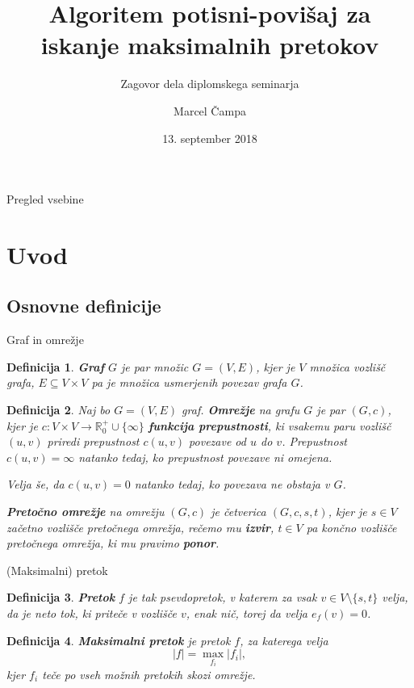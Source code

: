 \documentclass{beamer}
\title[Algoritem potisni-povišaj]{Algoritem potisni-povišaj za iskanje maksimalnih pretokov}
\subtitle{Zagovor dela diplomskega seminarja}
\author{Marcel Čampa}
\date{13. september 2018}
\institute[FMF UL]{Fakulteta za matematiko Univerze v Ljubljani}
\newtheorem{definicija}{Definicija}
\begin{document}
\begin{frame}
\maketitle
\end{frame}

\begin{frame}{Pregled vsebine}
\tableofcontents
\end{frame}


\section{Uvod}

\subsection{Osnovne definicije}
\begin{frame}{Graf in omrežje}
    \begin{definicija}
    \textbf{Graf} $G$ je par množic $G = (V,E)$, kjer je $V$ množica vozlišč grafa, $E \subseteq V \times V$ pa je množica usmerjenih povezav grafa $G$.
    \end{definicija}

    \begin{definicija}
    Naj bo $G = (V, E)$ graf. \textbf{Omrežje} na grafu $G$ je par $(G, c)$, kjer je $c \colon V \times V \rightarrow \mathbb{R}^+_0 \cup \{\infty\}$ \textbf{funkcija prepustnosti}, ki vsakemu paru vozlišč $(u,v)$ priredi prepustnost $c(u,v)$ povezave od $u$ do $v$. Prepustnost $c(u,v) = \infty$ natanko tedaj, ko prepustnost povezave ni omejena.

    Velja še, da $c(u,v)=0$ natanko tedaj, ko povezava ne obstaja v $G$.

    \textbf{Pretočno omrežje} na omrežju $(G,c)$ je četverica $(G,c,s,t)$, kjer je $s\in V$ začetno vozlišče pretočnega omrežja, rečemo mu \textbf{izvir}, $t\in V$ pa končno vozlišče pretočnega omrežja, ki mu pravimo \textbf{ponor}.
    \end{definicija}
\end{frame}

\begin{frame}{(Maksimalni) pretok}
    \begin{definicija}
    \textbf{Pretok} $f$ je tak psevdopretok, v katerem za vsak $v \in V \setminus\{s,t\}$ velja, da je neto tok, ki priteče v vozlišče $v$, enak nič, torej da velja $e_f(v) = 0$.
    \end{definicija}

    \begin{definicija}
    \textbf{Maksimalni pretok} je pretok $f$, za katerega velja \[|f| = \max_{f_i} |f_i|,\] kjer $f_i$ teče po vseh možnih pretokih skozi omrežje.
    \end{definicija}

\end{frame}
\end{document}
